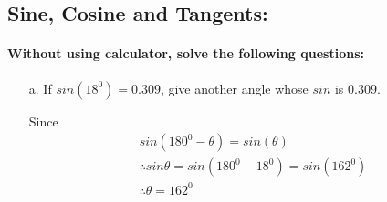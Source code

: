 \documentclass{article}
\begin{document}
\subsection{Sine, Cosine and Tangents:}
\paragraph{Without using calculator, solve the following questions:}
\begin{enumerate}
        \item[a. ] If $sin(18^{0})= 0.309$, give another angle whose $sin$ is $0.309$.
        
        Since
        \[
        \begin{aligned}
          &sin(180^0-\theta) = sin(\theta) \\
          &\therefore sin\theta = sin(180^{0}-18^{0}) = sin(162^{0}) \\
          &\therefore \theta = 162^{0}
        \end{aligned}
        \]
\end{enumerate}
\end{document}

